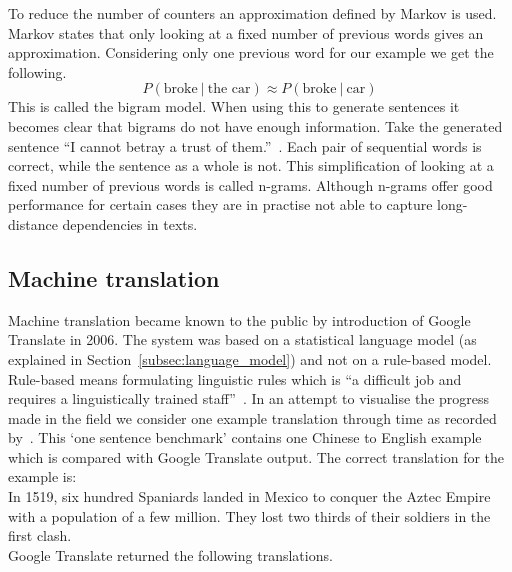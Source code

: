 To reduce the number of counters an approximation defined by Markov is used.
Markov states that only looking at a fixed number of previous words gives an approximation.
Considering only one previous word for our example we get the following.
\[ P(\text{broke} \: | \: \text{the car}) \approx P(\text{broke} \: | \: \text{car}) \]
This is called the bigram model.
When using this to generate sentences it becomes clear that bigrams do not have enough information.
Take the generated sentence ``I cannot betray a trust of them.''~\citep{langkilde1998practical}.
Each pair of sequential words is correct, while the sentence as a whole is not.
This simplification of looking at a fixed number of previous words is called n-grams.
Although n-grams offer good performance for certain cases they are in practise not able to capture long-distance dependencies in texts.

\subsection{Machine translation}
\label{subsec:mt}
Machine translation became known to the public by introduction of Google Translate in 2006.
The system was based on a statistical language model (as explained in Section~\ref{subsec:language_model}) and not on a rule-based model.
Rule-based means formulating linguistic rules which is ``a difficult job and requires a linguistically trained staff''~\citep{sumita1991experiments}.
In an attempt to visualise the progress made in the field we consider one example translation through time as recorded by~\citet{manning2017lectures}.
This `one sentence benchmark' contains one Chinese to English example which is compared with Google Translate output.
The correct translation for the example is:\\

In 1519, six hundred Spaniards landed in Mexico to conquer the Aztec Empire with a population of a few million.
They lost two thirds of their soldiers in the first clash.\\

Google Translate returned the following translations.

